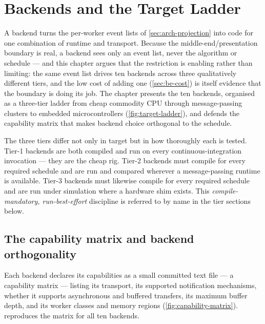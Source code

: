 \chapter{Backends and the Target Ladder}\label{ch:backends}

A backend turns the per-worker event lists of \cref{sec:arch-projection} into
code for one combination of runtime and transport. Because the
middle-end/presentation boundary is real, a backend sees only an event list,
never the algorithm or schedule --- and this chapter argues that the restriction
is enabling rather than limiting: the same event list drives ten backends across
three qualitatively different tiers, and the low cost of adding one
(\cref{sec:be-cost}) is itself evidence that the boundary is doing its job. The
chapter presents the ten backends, organised as a three-tier ladder from cheap
commodity CPU through message-passing clusters to embedded microcontrollers
(\cref{fig:target-ladder}), and defends the capability matrix that makes backend
choice orthogonal to the schedule.



The three tiers differ not only in target but in how thoroughly each is tested.
Tier-1 backends are both compiled and run on every continuous-integration
invocation --- they are the cheap rig. Tier-2 backends must compile for every
required schedule and are run and compared wherever a message-passing runtime is
available. Tier-3 backends must likewise compile for every required schedule and
are run under simulation where a hardware shim exists. This
\emph{compile-mandatory, run-best-effort} discipline is referred to by name in the
tier sections below.

\section{The capability matrix and backend orthogonality}\label{sec:be-matrix}

Each backend declares its capabilities as a small committed text file --- a
capability matrix --- listing its transport, its supported notification
mechanisms, whether it supports asynchronous and buffered transfers, its maximum
buffer depth, and its worker classes and memory regions
(\cref{fig:capability-matrix}).  reproduces the matrix for
all ten backends.

